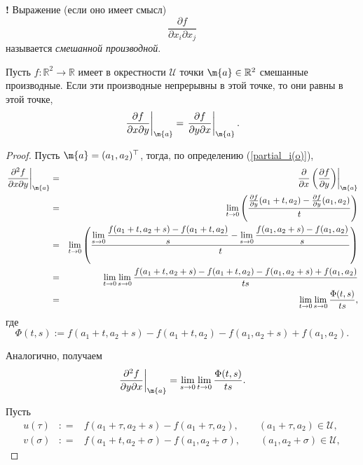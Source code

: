 \begin{mydanger}{\bf{!}}
    Выражение (если оно имеет смысл) 
    \[
     \frac{\partial f}{\partial x_i \partial x_j}
    \]
    называется \textit{смешанной производной}.
\end{mydanger}

\begin{theorem}[Шварц]
    Пусть $f:\mathbb{R}^2 \to \mathbb{R}$ имеет в окрестности $\mathscr{U}$ точки $\m{a} \in \mathbb{R}^2$ смешанные производные. Если эти производные непрерывны в этой точке, то они равны в этой точке, \ie
    \[
    \left.\frac{\partial f}{\partial x \partial y}\right|_\m{a} = \left.\frac{\partial f}{\partial y \partial x}\right|_\m{a}.
    \]
\end{theorem}

\begin{proof}
    Пусть $\m{a} = (a_1,a_2)^\top$, тогда, по определению (\ref{partial_i(o)}),
    \begin{eqnarray*}
       \left. \frac{\partial^2 f}{\partial x \partial y}\right|_\m{a} &=& \left. \frac{\partial}{\partial x}\left( \frac{\partial f}{\partial y} \right) \right|_\m{a} \\
       &=& \lim_{t \to 0} \left( \frac{\frac{\partial f}{\partial y}(a_1+t, a_2) - \frac{\partial f}{\partial y}(a_1,a_2)  }{t}  \right) \\
       &=& \lim_{t \to 0}\left( \frac{ \lim\limits_{s\to 0} \dfrac{f(a_1+t, a_2 +s) -f(a_1+t,a_2)}{s}  - \lim\limits_{s\to 0} \dfrac{f(a_1,a_2+s) -f(a_1,a_2)}{s} } {t}  \right) \\
       &=& \lim_{t\to 0} \lim_{s \to 0} \dfrac{f(a_1+t, a_2 +s) -f(a_1+t,a_2) - f(a_1,a_2+s) +f(a_1,a_2)}{ts} \\
       &=&\lim_{t\to 0} \lim_{s \to 0} \frac{\Phi(t,s)}{ts},
    \end{eqnarray*}
    где 
    \[
     \Phi(t,s):= f(a_1+t, a_2 +s) -f(a_1+t,a_2) - f(a_1,a_2+s) +f(a_1,a_2).
    \]

Аналогично, получаем
\[
 \left. \frac{\partial^2 f}{\partial y \partial x}\right|_\m{a} =  \lim_{s\to 0} \lim_{t \to 0} \frac{\Phi(t,s)}{ts}.
\]

Пусть 
\begin{eqnarray*}
 u(\tau) &: =& f(a_1 + \tau, a_2 + s) - f(a_1+ \tau, a_2), \qquad (a_1 + \tau, a_2) \in \mathscr{U} ,\\
 v(\sigma) &: =& f(a_1 + t, a_2 + \sigma) - f(a_1, a_2+\sigma), \qquad (a_1, a_2+\sigma) \in \mathscr{U} ,
\end{eqnarray*}


\end{proof}
